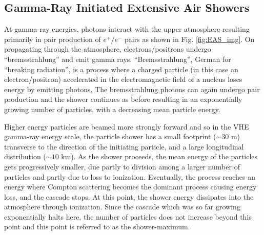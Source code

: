 \documentclass[main.tex]{subfiles}
\begin{document}
\subsection{Gamma-Ray Initiated Extensive Air Showers}
\label{Gamma-ray-EAS}
At gamma-ray energies, photons interact with the upper atmosphere resulting primarily in pair production of $e^+/e^-$ pairs as shown in Fig. \ref{fig:EAS_img}. On propagating through the atmosphere, electrons/positrons undergo ``bremsstrahlung'' and emit gamma rays. ``Bremsstrahlung'', German for ``breaking radiation'', is a process where a charged particle (in this case an electron/positron) accelerated in the electromagnetic field of a nucleus loses energy by emitting photons. The bremsstrahlung photons can again undergo pair production and the shower continues as before resulting in an exponentially growing number of particles, with a decreasing mean particle energy. \par
Higher energy particles are beamed more strongly forward and so in the VHE gamma-ray energy scale, the particle shower has a small footprint ($\sim 30$ m) transverse to the direction of the initiating particle, and a large longitudinal distribution ($\sim10$ km). As the shower proceeds, the mean energy of the particles gets progressively smaller, due partly to division among a larger number of particles and partly due to loss to ionization. Eventually, the process reaches an energy where Compton scattering becomes the dominant process causing energy loss, and the cascade stops. At this point, the shower energy dissipates into the atmosphere through ionization. Since the cascade which was so far growing exponentially halts here, the number of particles does not increase beyond this point and this point is referred to as the shower-maximum.
\end{document}
